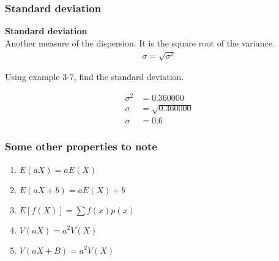 \documentclass[../INDE315.tex]{subfiles}
\begin{document}
\subsubsection*{Standard deviation}
\begin{defn}
    \textbf{Standard deviation} \\
    Another measure of the dispersion. It is the square root of the variance.
    \begin{equation*}
        \begin{aligned}
            \sigma = \sqrt{\sigma ^2}
        \end{aligned}
    \end{equation*}
\end{defn}
\begin{exmp}
    Using example 3-7, find the standard deviation.
\end{exmp}
\begin{equation*}
    \begin{aligned}
        \sigma ^2 &= 0.360000 \\
        \sigma &= \sqrt{0.360000} \\
        \sigma &= 0.6
    \end{aligned}
\end{equation*}

\subsubsection*{Some other properties to note}
\begin{enumerate}
    \item $E(aX) = aE(X)$
    \item $E(aX + b) = aE(X) + b$
    \item $E[f(X)] = \sum f(x) p(x)$
    \item $V(aX) = a^2 V(X)$
    \item $V(aX + B) = a^2 V(X)$
\end{enumerate}
\end{document}
